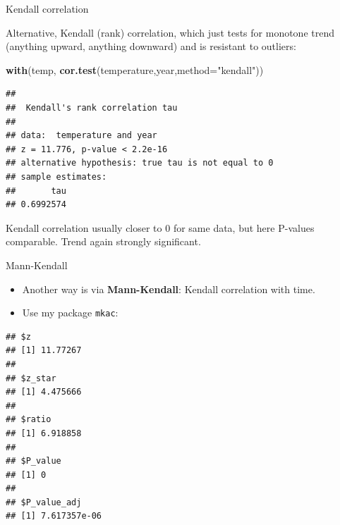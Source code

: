 \documentclass[
  ignorenonframetext,
]{beamer}
\newenvironment{Shaded}{\begin{snugshade}}{\end{snugshade}}
\newcommand{\DataTypeTok}[1]{\textcolor[rgb]{0.13,0.29,0.53}{#1}}
\newcommand{\KeywordTok}[1]{\textcolor[rgb]{0.13,0.29,0.53}{\textbf{#1}}}
\newcommand{\NormalTok}[1]{#1}
\newcommand{\OperatorTok}[1]{\textcolor[rgb]{0.81,0.36,0.00}{\textbf{#1}}}
\newcommand{\StringTok}[1]{\textcolor[rgb]{0.31,0.60,0.02}{#1}}
\begin{document}
\begin{frame}[fragile]{Kendall correlation}
\protect\hypertarget{kendall-correlation}{}

Alternative, Kendall (rank) correlation, which just tests for monotone
trend (anything upward, anything downward) and is resistant to outliers:

\begin{Shaded}
\begin{Highlighting}[]
\KeywordTok{with}\NormalTok{(temp, }\KeywordTok{cor.test}\NormalTok{(temperature,year,}\DataTypeTok{method=}\StringTok{"kendall"}\NormalTok{))}
\end{Highlighting}
\end{Shaded}

\begin{verbatim}
## 
##  Kendall's rank correlation tau
## 
## data:  temperature and year
## z = 11.776, p-value < 2.2e-16
## alternative hypothesis: true tau is not equal to 0
## sample estimates:
##       tau 
## 0.6992574
\end{verbatim}

Kendall correlation usually closer to 0 for same data, but here P-values
comparable. Trend again strongly significant.

\end{frame}

\begin{frame}[fragile]{Mann-Kendall}
\protect\hypertarget{mann-kendall}{}

\begin{itemize}
\item
  Another way is via \textbf{Mann-Kendall}: Kendall correlation with
  time.
\item
  Use my package \texttt{mkac}:
\end{itemize}

\footnotesize

\begin{Shaded}
\end{Shaded}

\begin{verbatim}
## $z
## [1] 11.77267
## 
## $z_star
## [1] 4.475666
## 
## $ratio
## [1] 6.918858
## 
## $P_value
## [1] 0
## 
## $P_value_adj
## [1] 7.617357e-06
\end{verbatim}

\normalsize

\end{frame}
\end{document}
